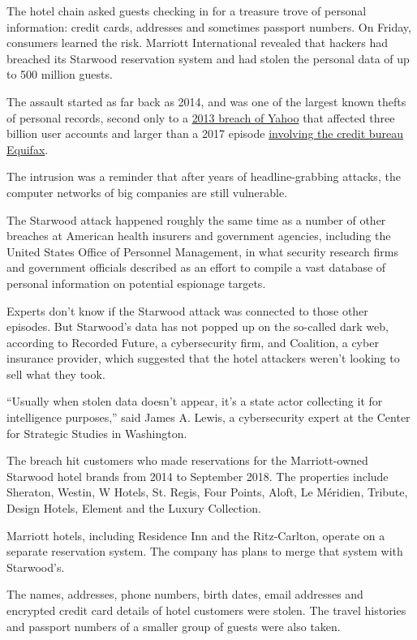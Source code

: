 The hotel chain asked guests checking in for a treasure trove of
personal information: credit cards, addresses and sometimes passport
numbers. On Friday, consumers learned the risk. Marriott International
revealed that hackers had breached its Starwood reservation system and
had stolen the personal data of up to 500 million guests.

The assault started as far back as 2014, and was one of the largest
known thefts of personal records, second only to a
\href{https://www.nytimes.com/2017/10/03/technology/yahoo-hack-3-billion-users.html}{2013
breach of Yahoo} that affected three billion user accounts and larger
than a 2017 episode
\href{https://www.nytimes.com/2017/09/14/business/equifax-hack-what-we-know.html}{involving
the credit bureau Equifax}.

The intrusion was a reminder that after years of headline-grabbing
attacks, the computer networks of big companies are still vulnerable.

The Starwood attack happened roughly the same time as a number of other
breaches at American health insurers and government agencies, including
the United States Office of Personnel Management, in what security
research firms and government officials described as an effort to
compile a vast database of personal information on potential espionage
targets.

Experts don't know if the Starwood attack was connected to those other
episodes. But Starwood's data has not popped up on the so-called dark
web, according to Recorded Future, a cybersecurity firm, and Coalition,
a cyber insurance provider, which suggested that the hotel attackers
weren't looking to sell what they took.

``Usually when stolen data doesn't appear, it's a state actor collecting
it for intelligence purposes,'' said James A. Lewis, a cybersecurity
expert at the Center for Strategic Studies in Washington.

The breach hit customers who made reservations for the Marriott-owned
Starwood hotel brands from 2014 to September 2018. The properties
include Sheraton, Westin, W Hotels, St. Regis, Four Points, Aloft, Le
Méridien, Tribute, Design Hotels, Element and the Luxury Collection.

Marriott hotels, including Residence Inn and the Ritz-Carlton, operate
on a separate reservation system. The company has plans to merge that
system with Starwood's.

The names, addresses, phone numbers, birth dates, email addresses and
encrypted credit card details of hotel customers were stolen. The travel
histories and passport numbers of a smaller group of guests were also
taken.

